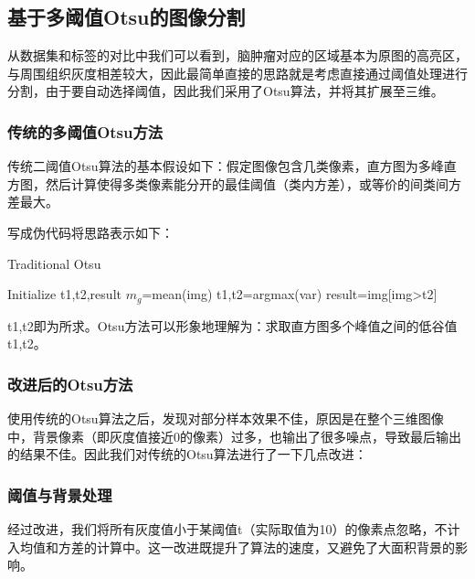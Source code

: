 \documentclass[UTF8]{ctexart}
\begin{document}
\subsection{基于多阈值Otsu的图像分割}
从数据集和标签的对比中我们可以看到，脑肿瘤对应的区域基本为原图的高亮区，与周围组织灰度相差较大，因此最简单直接的思路就是考虑直接通过阈值处理进行分割，由于要自动选择阈值，因此我们采用了Otsu算法，并将其扩展至三维。

\subsubsection{传统的多阈值Otsu方法}
传统二阈值Otsu算法的基本假设如下：假定图像包含几类像素，直方图为多峰直方图，然后计算使得多类像素能分开的最佳阈值（类内方差），或等价的间类间方差最大。

写成伪代码将思路表示如下：

\begin{algorithm}[H]
    \caption{Traditional Otsu}\label{algorithm}
        Initialize t1,t2,result\;
        $m_g$=mean(img)\;
        t1,t2=argmax(var)\;
        result=img[img>t2]\;
        
\end{algorithm}

	t1,t2即为所求。Otsu方法可以形象地理解为：求取直方图多个峰值之间的低谷值t1,t2。
\subsubsection{改进后的Otsu方法}
使用传统的Otsu算法之后，发现对部分样本效果不佳，原因是在整个三维图像中，背景像素（即灰度值接近0的像素）过多，也输出了很多噪点，导致最后输出的结果不佳。因此我们对传统的Otsu算法进行了一下几点改进：
\subsubsection*{阈值与背景处理}
经过改进，我们将所有灰度值小于某阈值t（实际取值为10）的像素点忽略，不计入均值和方差的计算中。这一改进既提升了算法的速度，又避免了大面积背景的影响。
\end{document}

